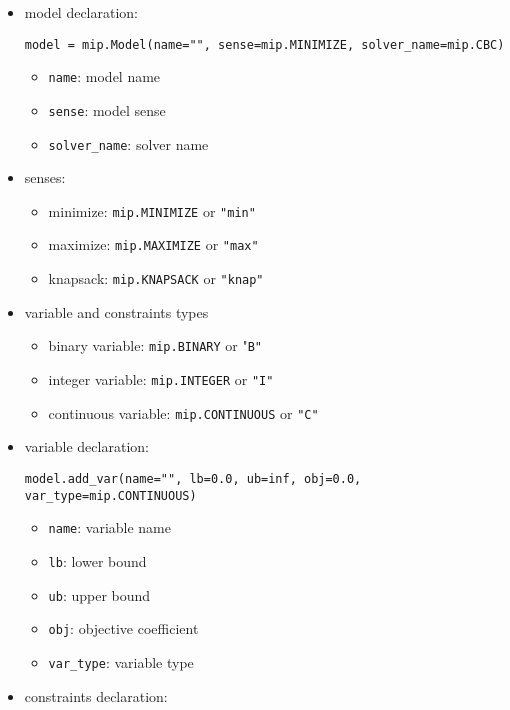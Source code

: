 \documentclass[english]{article}
\begin{document}
\begin{itemize}
  \item model declaration:
        \begin{verbatim}
model = mip.Model(name="", sense=mip.MINIMIZE, solver_name=mip.CBC)
\end{verbatim}
        \begin{itemize}
          \item \texttt{name}: model name
          \item \texttt{sense}: model sense
          \item \texttt{solver\_name}: solver name
        \end{itemize}
  \item senses:
        \begin{itemize}
          \item minimize: \texttt{mip.MINIMIZE} or \texttt{"min"}
          \item maximize: \texttt{mip.MAXIMIZE} or \texttt{"max"}
          \item knapsack: \texttt{mip.KNAPSACK} or \texttt{"knap"}
        \end{itemize}
  \item variable and constraints types
        \begin{itemize}
          \item binary variable: \texttt{mip.BINARY} or "\texttt{B"}
          \item integer variable: \texttt{mip.INTEGER} or \texttt{"I"}
          \item continuous variable: \texttt{mip.CONTINUOUS} or \texttt{"C"}
        \end{itemize}
  \item variable declaration:
        \begin{verbatim}
model.add_var(name="", lb=0.0, ub=inf, obj=0.0, var_type=mip.CONTINUOUS)
  \end{verbatim}
        \begin{itemize}
          \item \texttt{name}: variable name
          \item \texttt{lb}: lower bound
          \item \texttt{ub}: upper bound
          \item \texttt{obj}: objective coefficient
          \item \texttt{var\_type}: variable type
        \end{itemize}
  \item constraints declaration:

\end{itemize}
\end{document}
